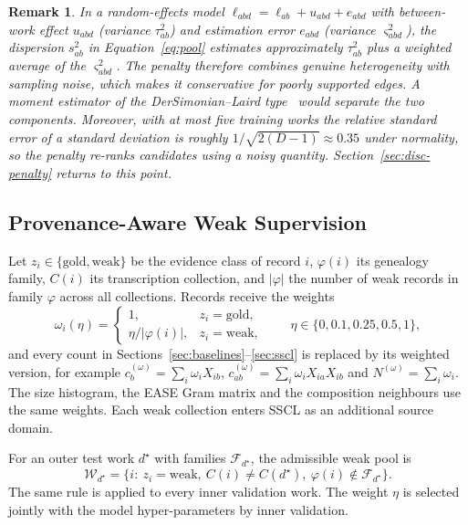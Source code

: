 \documentclass[applsci,article,submit,oneauthor]{Definitions/mdpi}
\newcommand{\fmly}{\varphi}
\newtheorem{xrem}{Remark}
\begin{document}
\begin{xrem}
\label{rem:dispersion}
In a random-effects model $\ell_{abd}=\ell_{ab}+u_{abd}+e_{abd}$ with between-work effect $u_{abd}$ (variance $\tau_{ab}^2$) and estimation error $e_{abd}$ (variance $\varsigma_{abd}^2$), the dispersion $s_{ab}^2$ in Equation~\eqref{eq:pool} estimates approximately $\tau_{ab}^2$ plus a weighted average of the $\varsigma_{abd}^2$. The penalty therefore combines genuine heterogeneity with sampling noise, which makes it conservative for poorly supported edges. A moment estimator of the DerSimonian--Laird type~\cite{dersimonian1986} would separate the two components. Moreover, with at most five training works the relative standard error of a standard deviation is roughly $1/\sqrt{2(D-1)}\approx0.35$ under normality, so the penalty re-ranks candidates using a noisy quantity. Section~\ref{sec:disc-penalty} returns to this point.
\end{xrem}

\subsection{Provenance-Aware Weak Supervision}
\label{sec:weak}

Let $z_i\in\{\text{gold},\text{weak}\}$ be the evidence class of record $i$, $\fmly(i)$ its genealogy family, $C(i)$ its transcription collection, and $|\fmly|$ the number of weak records in family $\fmly$ across all collections. Records receive the weights
\begin{equation}
\omega_i(\eta)=\begin{cases}1,& z_i=\text{gold},\\ \eta/|\fmly(i)|,& z_i=\text{weak},\end{cases}\qquad \eta\in\{0,0.1,0.25,0.5,1\},
\label{eq:weights}
\end{equation}
and every count in Sections~\ref{sec:baselines}--\ref{sec:sscl} is replaced by its weighted version, for example $c_b^{(\omega)}=\sum_i\omega_iX_{ib}$, $c_{ab}^{(\omega)}=\sum_i\omega_iX_{ia}X_{ib}$ and $N^{(\omega)}=\sum_i\omega_i$. The size histogram, the EASE Gram matrix and the composition neighbours use the same weights. Each weak collection enters SSCL as an additional source domain.

For an outer test work $d^\star$ with families $\mathcal F_{d^\star}$, the admissible weak pool is
\begin{equation}
\mathcal W_{d^\star}=\bigl\{i:\ z_i=\text{weak},\ C(i)\neq C(d^\star),\ \fmly(i)\notin\mathcal F_{d^\star}\bigr\}.
\label{eq:pool-weak}
\end{equation}
The same rule is applied to every inner validation work. The weight $\eta$ is selected jointly with the model hyper-parameters by inner validation.
\end{document}
